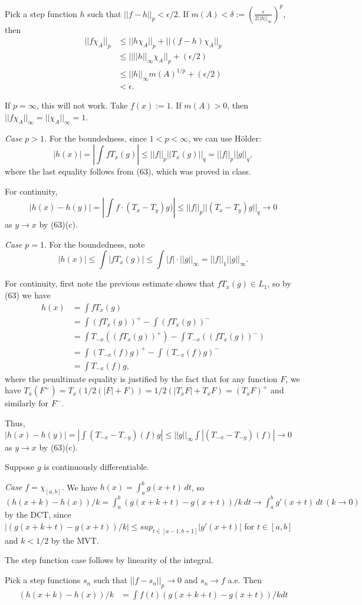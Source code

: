\documentclass{article}
\begin{document}
Pick a step function $h$ such that $||f - h||_p < \epsilon/2$. If $m(A) < \delta := (\frac \epsilon {2 ||h||_\infty})^p$, then
\begin{align*}
||f \chi_A||_p & \le ||h \chi_A||_p + ||(f-h) \chi_A||_p
\\ & \le || ||h||_\infty \chi_A||_p + (\epsilon/2)
\\ & \le ||h||_\infty m(A)^{1/p} + (\epsilon/2)
\\ & < \epsilon.
\end{align*}

If $p = \infty$, this will not work.  Take $f(x) := 1$. If $m(A) >0$, then $||f\chi_A||_\infty = ||\chi_A||_\infty = 1$.

 \emph{Case $p>1$.} For the boundedness, since $1<p<\infty$, we can use H\"{o}lder:
$$|h(x)| = |\int f T_x(g)| \le ||f||_p||T_x(g)||_q = ||f||_p||g||_q,$$
where the last equality follows from (63), which was proved in class.

For continuity,
$$|h(x) - h(y)| = |\int f \cdot (T_x - T_y)g)| \le ||f||_p||(T_x - T_y)g||_q \to 0$$
as $y\to x$ by (63)(c).

\emph{Case $p=1$}. For the boundedness, note 
$$|h(x)| \le \int |f T_x(g)| \le \int |f| \cdot ||g||_\infty = ||f||_1||g||_\infty.$$

For continuity, first note the previous estimate shows that $f T_x(g) \in L_1$, so by (63) we have
\begin{align*}
h(x) & = \int f T_x (g) 
\\ & = \int (f T_x (g))^+ - \int (f T_x (g))^-
\\ & = \int T_{-x} ((f T_x (g))^+) - \int T_{-x} ((f T_x (g))^-)
\\ & = \int (T_{-x}(f) g)^+ - \int (T_{-x} (f) g)^-
\\ & = \int T_{-x}(f) g,
\end{align*}
where the penultimate equality is justified by the fact that for any function $F$, we have $T_x(F^+) = T_x(1/2(|F| + F)) = 1/2(|T_xF| + T_xF) = (T_xF)^+$ and similarly for $F^-$.

Thus, $|h(x) - h(y)| = |\int (T_{-x}-T_{-y})(f) g| \le ||g||_\infty \int |(T_{-x} - T_{-y})(f)|  \to 0$
as $y\to x$ by (63)(c).

Suppose $g$ is continuously differentiable.

\emph{Case $f = \chi_{[a,b]}$.}  We have $h(x) = \int_a^b g(x+t) \,dt$, so
 $(h(x + k) - h(x))/k = \int_a^b (g(x +k + t) - g(x + t))/k \,dt
  \to \int_a^b g'(x + t) \,dt  \,(k \to 0)$
 by the DCT, since $|(g(x +k + t) - g(x + t))/k| \le sup_{t \in [a-1, b+1]} |g'(x+t)|$ for $t \in [a,b]$ and $k < 1/2$ by the MVT.

The step function case follows by linearity of the integral.

Pick a step functions $s_n$ such that $||f-s_n||_p \to 0$ and $s_n \to f$ a.e.
Then 
\begin{align*}
(h(x + k) - h(x))/k & = \int f(t)(g(x +k + t) - g(x + t))/k dt
\\ &
\end{align*}
\end{document}
